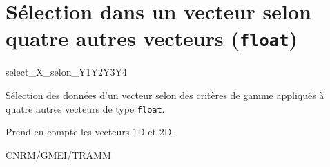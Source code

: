 %
\section{S\'election dans un vecteur selon quatre autres vecteurs (\texttt{float})}

 \textsf{select\_X\_selon\_Y1Y2Y3Y4}
\label{OP-Select_X_selon_Y1Y2Y3Y4}

S\'election des donn\'ees d'un vecteur selon des
crit\`eres de gamme appliqu\'es \`a quatre autres vecteurs de type \texttt{float}.

\bigskip





Prend en compte les vecteurs 1D et 2D.

CNRM/GMEI/TRAMM


